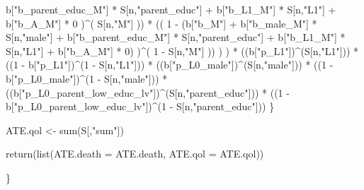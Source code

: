 \documentclass[
]{book}
\newenvironment{Shaded}{\begin{snugshade}}{\end{snugshade}}
\newcommand{\AttributeTok}[1]{\textcolor[rgb]{0.77,0.63,0.00}{#1}}
\newcommand{\DecValTok}[1]{\textcolor[rgb]{0.00,0.00,0.81}{#1}}
\newcommand{\FunctionTok}[1]{\textcolor[rgb]{0.00,0.00,0.00}{#1}}
\newcommand{\NormalTok}[1]{#1}
\newcommand{\OtherTok}[1]{\textcolor[rgb]{0.56,0.35,0.01}{#1}}
\newcommand{\SpecialCharTok}[1]{\textcolor[rgb]{0.00,0.00,0.00}{#1}}
\newcommand{\StringTok}[1]{\textcolor[rgb]{0.31,0.60,0.02}{#1}}
\begin{document}
\begin{Shaded}
\begin{Highlighting}[]
\NormalTok{                             b[}\StringTok{"b\_parent\_educ\_M"}\NormalTok{] }\SpecialCharTok{*}\NormalTok{ S[n,}\StringTok{"parent\_educ"}\NormalTok{] }\SpecialCharTok{+} 
\NormalTok{                             b[}\StringTok{"b\_L1\_M"}\NormalTok{] }\SpecialCharTok{*}\NormalTok{ S[n,}\StringTok{"L1"}\NormalTok{] }\SpecialCharTok{+}
\NormalTok{                             b[}\StringTok{"b\_A\_M"}\NormalTok{] }\SpecialCharTok{*} \DecValTok{0}\NormalTok{ )}\SpecialCharTok{\^{}}\NormalTok{( S[n,}\StringTok{"M"}\NormalTok{] )) }\SpecialCharTok{*}
\NormalTok{                        (( }\DecValTok{1} \SpecialCharTok{{-}}\NormalTok{ (b[}\StringTok{"b\_M"}\NormalTok{] }\SpecialCharTok{+} 
\NormalTok{                                  b[}\StringTok{"b\_male\_M"}\NormalTok{] }\SpecialCharTok{*}\NormalTok{ S[n,}\StringTok{"male"}\NormalTok{] }\SpecialCharTok{+} 
\NormalTok{                                  b[}\StringTok{"b\_parent\_educ\_M"}\NormalTok{] }\SpecialCharTok{*}\NormalTok{ S[n,}\StringTok{"parent\_educ"}\NormalTok{] }\SpecialCharTok{+} 
\NormalTok{                                  b[}\StringTok{"b\_L1\_M"}\NormalTok{] }\SpecialCharTok{*}\NormalTok{ S[n,}\StringTok{"L1"}\NormalTok{] }\SpecialCharTok{+}
\NormalTok{                                  b[}\StringTok{"b\_A\_M"}\NormalTok{] }\SpecialCharTok{*} \DecValTok{0}\NormalTok{) )}\SpecialCharTok{\^{}}\NormalTok{( }\DecValTok{1} \SpecialCharTok{{-}}\NormalTok{ S[n,}\StringTok{"M"}\NormalTok{] )) ) ) }\SpecialCharTok{*}
\NormalTok{    ((b[}\StringTok{"p\_L1"}\NormalTok{])}\SpecialCharTok{\^{}}\NormalTok{(S[n,}\StringTok{"L1"}\NormalTok{])) }\SpecialCharTok{*}
\NormalTok{    ((}\DecValTok{1} \SpecialCharTok{{-}}\NormalTok{ b[}\StringTok{"p\_L1"}\NormalTok{])}\SpecialCharTok{\^{}}\NormalTok{(}\DecValTok{1} \SpecialCharTok{{-}}\NormalTok{ S[n,}\StringTok{"L1"}\NormalTok{])) }\SpecialCharTok{*}
\NormalTok{    ((b[}\StringTok{"p\_L0\_male"}\NormalTok{])}\SpecialCharTok{\^{}}\NormalTok{(S[n,}\StringTok{"male"}\NormalTok{])) }\SpecialCharTok{*} 
\NormalTok{    ((}\DecValTok{1} \SpecialCharTok{{-}}\NormalTok{ b[}\StringTok{"p\_L0\_male"}\NormalTok{])}\SpecialCharTok{\^{}}\NormalTok{(}\DecValTok{1} \SpecialCharTok{{-}}\NormalTok{ S[n,}\StringTok{"male"}\NormalTok{])) }\SpecialCharTok{*} 
\NormalTok{    ((b[}\StringTok{"p\_L0\_parent\_low\_educ\_lv"}\NormalTok{])}\SpecialCharTok{\^{}}\NormalTok{(S[n,}\StringTok{"parent\_educ"}\NormalTok{])) }\SpecialCharTok{*}
\NormalTok{    ((}\DecValTok{1} \SpecialCharTok{{-}}\NormalTok{ b[}\StringTok{"p\_L0\_parent\_low\_educ\_lv"}\NormalTok{])}\SpecialCharTok{\^{}}\NormalTok{(}\DecValTok{1} \SpecialCharTok{{-}}\NormalTok{ S[n,}\StringTok{"parent\_educ"}\NormalTok{])) }
\NormalTok{\}}

\NormalTok{ATE.qol }\OtherTok{\textless{}{-}} \FunctionTok{sum}\NormalTok{(S[,}\StringTok{"sum"}\NormalTok{])}

\FunctionTok{return}\NormalTok{(}\FunctionTok{list}\NormalTok{(}\AttributeTok{ATE.death =}\NormalTok{ ATE.death, }\AttributeTok{ATE.qol =}\NormalTok{ ATE.qol))}
  
\NormalTok{\}}
\end{Highlighting}
\end{Shaded}
\end{document}
